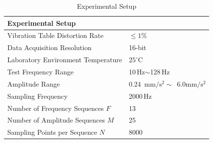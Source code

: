 \documentclass[journal]{IEEEtranTIE}
\newcommand{\valFreqScanStart}{10}
\newcommand{\valFreqScanEnd}{128}
\newcommand{\valFreqScanPoints}{13}
\newcommand{\valMagScanStart}{0.24}
\newcommand{\valMagScanEnd}{6.0}
\newcommand{\valMagScanPoints}{25}
\newcommand{\valSequenceNum}{8000}
\newcommand{\fmax}{F} %
\newcommand{\mmax}{M} %
\newcommand{\pmax}{N} %
\begin{document}
\begin{table}[htbp]
    \centering
    \caption{Experimental Setup}
    \label{tab:experimental_setup}
    \begin{tabular}{ll}
        \hline\hline
        \multicolumn{2}{l}{\textbf{Experimental Setup}}                                                                              \\
        \hline
        Vibration Table Distortion Rate       & $\leq 1\%$                                                                           \\
        Data Acquisition Resolution           & 16-bit                                                                               \\
        Laboratory Environment Temperature    & $25^\circ\text{C}$                                                                   \\
        Test Frequency Range                  & \valFreqScanStart\,Hz$\sim$\valFreqScanEnd\,Hz                                       \\
        Amplitude Range                       & \valMagScanStart~$\text{mm}/ \text{s}^2\sim$~\valMagScanEnd  $\text{mm}/ \text{s}^2$ \\
        Sampling Frequency                    & 2000\,Hz                                                                             \\
        Number of Frequency Sequences $\fmax$ & \valFreqScanPoints                                                                   \\
        Number of Amplitude Sequences $\mmax$ & \valMagScanPoints                                                                    \\
        Sampling Points per Sequence $\pmax$  & \valSequenceNum                                                                      \\
        \hline\hline
    \end{tabular}
\end{table}
\end{document}
